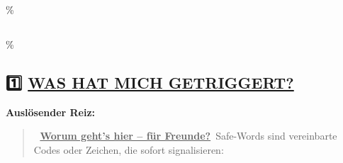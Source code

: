 \hypertarget{section-1}{\%
\subsection{}\label{section-1}}

\hypertarget{was-hat-mich-getriggert}{\%
\subsection{\texorpdfstring{1️⃣ \textbf{\ul{WAS HAT MICH GETRIGGERT?}}}{1️⃣ WAS HAT MICH GETRIGGERT?}}\label{was-hat-mich-getriggert}}

\textbf{Auslösender Reiz:}\

\begin{quote}
🧠 \textbf{\ul{Worum geht's hier -- für Freunde?}}\
Safe-Words sind vereinbarte Codes oder Zeichen, die sofort signalisieren:
\end{quote}
